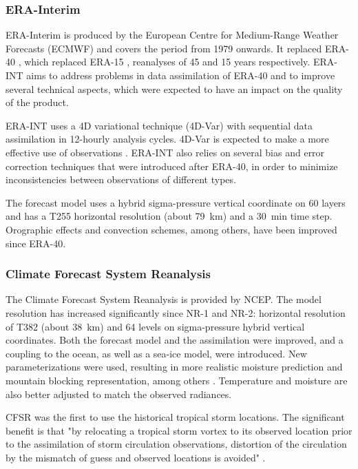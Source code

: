 \documentclass[smallextended]{svjour3}       %
\begin{document}
	
	\subsubsection{ERA-Interim}
	
	ERA-Interim \citep[ERA-INT --][]{Dee2011a} is produced by the European Centre for Medium-Range Weather Forecasts (ECMWF) and covers the period from 1979 onwards. It replaced ERA-40 \citep{Uppala2005}, which replaced ERA-15 \citep{Gibson1997}, reanalyses of 45 and 15 years respectively. ERA-INT aims to address problems in data assimilation of ERA-40 and to improve several technical aspects, which were expected to have an impact on the quality of the product.
	
	ERA-INT uses a 4D variational technique (4D-Var) with sequential data assimilation in 12-hourly analysis cycles. 4D-Var is expected to make a more effective use of observations \citep{Dee2011a}. ERA-INT also relies on several bias and error correction techniques that were introduced after ERA-40, in order to minimize inconsistencies between observations of different types.
	
	The forecast model uses a hybrid sigma-pressure vertical coordinate on 60 layers and has a T255 horizontal resolution (about 79~km) and a 30~min time step. Orographic effects and convection schemes, among others, have been improved since ERA-40.
	
	
	\subsubsection{Climate Forecast System Reanalysis}
	
	The Climate Forecast System Reanalysis \citep[CFSR --][]{Saha2010a} is provided by NCEP. The model resolution has increased significantly since NR-1 and NR-2: horizontal resolution of T382 (about 38~km) and 64 levels on sigma-pressure hybrid vertical coordinates. Both the forecast model and the assimilation were improved, and a coupling to the ocean, as well as a sea-ice model, were introduced. New parameterizations were used, resulting in more realistic moisture prediction and mountain blocking representation, among others \citep{Saha2010a}. Temperature and moisture are also better adjusted to match the observed radiances.
	
	CFSR was the first to use the historical tropical storm locations. The significant benefit is that "by relocating a tropical storm vortex to its observed location prior to the assimilation of storm circulation observations, distortion of the circulation by the mismatch of guess and observed locations is avoided" \citep{Saha2010a}.
	
\end{document}
